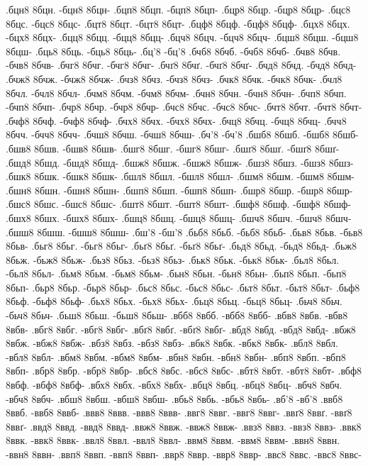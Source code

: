 {.бцн8 8бцн. -бцн8 8бцн-
.бцп8 8бцп. -бцп8 8бцп-
.бцр8 8бцр. -бцр8 8бцр-
.бцс8 8бцс. -бцс8 8бцс-
.бцт8 8бцт. -бцт8 8бцт-
.бцф8 8бцф. -бцф8 8бцф-
.бцх8 8бцх. -бцх8 8бцх-
.бцц8 8бцц. -бцц8 8бцц-
.бцч8 8бцч. -бцч8 8бцч-
.бцш8 8бцш. -бцш8 8бцш-
.бць8 8бць. -бць8 8бць-
.бц'8 -бц'8
.бчб8 8бчб. -бчб8 8бчб-
.бчв8 8бчв. -бчв8 8бчв-
.бчг8 8бчг. -бчг8 8бчг-
.бчґ8 8бчґ. -бчґ8 8бчґ-
.бчд8 8бчд. -бчд8 8бчд-
.бчж8 8бчж. -бчж8 8бчж-
.бчз8 8бчз. -бчз8 8бчз-
.бчк8 8бчк. -бчк8 8бчк-
.бчл8 8бчл. -бчл8 8бчл-
.бчм8 8бчм. -бчм8 8бчм-
.бчн8 8бчн. -бчн8 8бчн-
.бчп8 8бчп. -бчп8 8бчп-
.бчр8 8бчр. -бчр8 8бчр-
.бчс8 8бчс. -бчс8 8бчс-
.бчт8 8бчт. -бчт8 8бчт-
.бчф8 8бчф. -бчф8 8бчф-
.бчх8 8бчх. -бчх8 8бчх-
.бчц8 8бчц. -бчц8 8бчц-
.бчч8 8бчч. -бчч8 8бчч-
.бчш8 8бчш. -бчш8 8бчш-
.бч'8 -бч'8
.бшб8 8бшб. -бшб8 8бшб-
.бшв8 8бшв. -бшв8 8бшв-
.бшг8 8бшг. -бшг8 8бшг-
.бшґ8 8бшґ. -бшґ8 8бшґ-
.бшд8 8бшд. -бшд8 8бшд-
.бшж8 8бшж. -бшж8 8бшж-
.бшз8 8бшз. -бшз8 8бшз-
.бшк8 8бшк. -бшк8 8бшк-
.бшл8 8бшл. -бшл8 8бшл-
.бшм8 8бшм. -бшм8 8бшм-
.бшн8 8бшн. -бшн8 8бшн-
.бшп8 8бшп. -бшп8 8бшп-
.бшр8 8бшр. -бшр8 8бшр-
.бшс8 8бшс. -бшс8 8бшс-
.бшт8 8бшт. -бшт8 8бшт-
.бшф8 8бшф. -бшф8 8бшф-
.бшх8 8бшх. -бшх8 8бшх-
.бшц8 8бшц. -бшц8 8бшц-
.бшч8 8бшч. -бшч8 8бшч-
.бшш8 8бшш. -бшш8 8бшш-
.бш'8 -бш'8
.бьб8 8бьб. -бьб8 8бьб-
.бьв8 8бьв. -бьв8 8бьв-
.бьг8 8бьг. -бьг8 8бьг-
.бьґ8 8бьґ. -бьґ8 8бьґ-
.бьд8 8бьд. -бьд8 8бьд-
.бьж8 8бьж. -бьж8 8бьж-
.бьз8 8бьз. -бьз8 8бьз-
.бьк8 8бьк. -бьк8 8бьк-
.бьл8 8бьл. -бьл8 8бьл-
.бьм8 8бьм. -бьм8 8бьм-
.бьн8 8бьн. -бьн8 8бьн-
.бьп8 8бьп. -бьп8 8бьп-
.бьр8 8бьр. -бьр8 8бьр-
.бьс8 8бьс. -бьс8 8бьс-
.бьт8 8бьт. -бьт8 8бьт-
.бьф8 8бьф. -бьф8 8бьф-
.бьх8 8бьх. -бьх8 8бьх-
.бьц8 8бьц. -бьц8 8бьц-
.бьч8 8бьч. -бьч8 8бьч-
.бьш8 8бьш. -бьш8 8бьш-
.вбб8 8вбб. -вбб8 8вбб-
.вбв8 8вбв. -вбв8 8вбв-
.вбг8 8вбг. -вбг8 8вбг-
.вбґ8 8вбґ. -вбґ8 8вбґ-
.вбд8 8вбд. -вбд8 8вбд-
.вбж8 8вбж. -вбж8 8вбж-
.вбз8 8вбз. -вбз8 8вбз-
.вбк8 8вбк. -вбк8 8вбк-
.вбл8 8вбл. -вбл8 8вбл-
.вбм8 8вбм. -вбм8 8вбм-
.вбн8 8вбн. -вбн8 8вбн-
.вбп8 8вбп. -вбп8 8вбп-
.вбр8 8вбр. -вбр8 8вбр-
.вбс8 8вбс. -вбс8 8вбс-
.вбт8 8вбт. -вбт8 8вбт-
.вбф8 8вбф. -вбф8 8вбф-
.вбх8 8вбх. -вбх8 8вбх-
.вбц8 8вбц. -вбц8 8вбц-
.вбч8 8вбч. -вбч8 8вбч-
.вбш8 8вбш. -вбш8 8вбш-
.вбь8 8вбь. -вбь8 8вбь-
.вб'8 -вб'8
.ввб8 8ввб. -ввб8 8ввб-
.ввв8 8ввв. -ввв8 8ввв-
.ввг8 8ввг. -ввг8 8ввг-
.ввґ8 8ввґ. -ввґ8 8ввґ-
.ввд8 8ввд. -ввд8 8ввд-
.ввж8 8ввж. -ввж8 8ввж-
.ввз8 8ввз. -ввз8 8ввз-
.ввк8 8ввк. -ввк8 8ввк-
.ввл8 8ввл. -ввл8 8ввл-
.ввм8 8ввм. -ввм8 8ввм-
.ввн8 8ввн. -ввн8 8ввн-
.ввп8 8ввп. -ввп8 8ввп-
.ввр8 8ввр. -ввр8 8ввр-
.ввс8 8ввс. -ввс8 8ввс-
}
